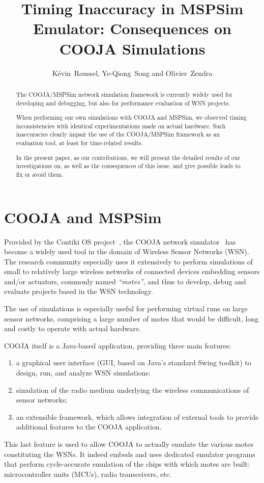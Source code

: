 \documentclass[10pt,final,journal,twocolumn]{IEEEtran}
\title{Timing Inaccuracy in MSPSim Emulator: Consequences on COOJA Simulations}
\author{
K\'evin~Roussel, Ye-Qiong~Song and Olivier~Zendra%
}
\date{}
\begin{document}
\maketitle


\begin{abstract}
The COOJA/MSPSim network simulation framework is currently widely used
for developing and debugging, but also for performance evaluation
of WSN projects.

When performing our own simulations with COOJA and MSPSim, we observed timing
inconsistencies with identical experimentations made on actual hardware.
Such inaccuracies clearly impair the use of the COOJA/MSPSim framework as
an evaluation tool, at least for time-related results.

In the present paper, as our contributions, we will present the detailed
results of our investigations on, as well as the consequences of this issue,
and give possible leads to fix or avoid them.
\end{abstract}



\section{COOJA and MSPSim}
\label{introduction}

Provided by the Contiki OS project~\cite{ContikiOS}, the COOJA network
simulator~\cite{Cooja} has become a widely used tool in the domain of
Wireless Sensor Networks (WSN). The research community especially uses
it extensively to perform simulations of small to relatively large wireless
networks of connected devices embedding sensors and/or actuators, commonly
named \emph{``motes''}, and thus to develop, debug and evaluate projects
based in the WSN technology.

The use of simulations is especially useful for performing virtual runs
on large sensor networks, comprising a large number of motes that would
be difficult, long and costly to operate with actual hardware.

COOJA itself is a Java-based application, providing three main features:
\begin{enumerate}
\item a graphical user interface (GUI, based on Java's standard Swing toolkit)
to design, run, and analyze WSN simulations;
\item simulation of the radio medium underlying the wireless communications
of sensor networks;
\item an extensible framework, which allows integration of external tools
to provide additional features to the COOJA application.
\end{enumerate}
This last feature is used to allow COOJA to actually emulate the various
motes constituting the WSNs. It indeed embeds and uses dedicated emulator
programs that perform cycle-accurate emulation of the chips with which motes
are built: microcontroller units (MCUs), radio transceivers, etc.
\end{document}
